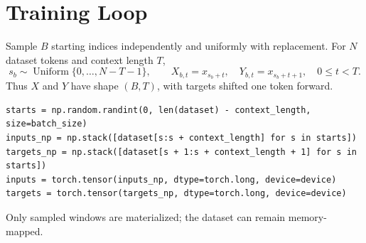 

\section{Training Loop}



Sample $B$ starting indices independently
and uniformly with replacement. For $N$ dataset tokens and context length $T$,
\[
s_b\sim\operatorname{Uniform}\{0,\ldots,N-T-1\},\qquad
X_{b,t}=x_{s_b+t},\quad Y_{b,t}=x_{s_b+t+1},\quad 0\leq t<T.
\]
Thus $X$ and $Y$ have shape $(B,T)$, with targets shifted one token forward.
\par\noindent
\begin{minipage}{\linewidth}
\begin{lstlisting}[caption={Sampling input and target windows}]
starts = np.random.randint(0, len(dataset) - context_length, size=batch_size)
inputs_np = np.stack([dataset[s:s + context_length] for s in starts])
targets_np = np.stack([dataset[s + 1:s + context_length + 1] for s in starts])
inputs = torch.tensor(inputs_np, dtype=torch.long, device=device)
targets = torch.tensor(targets_np, dtype=torch.long, device=device)
\end{lstlisting}
\end{minipage}\par
Only sampled windows are materialized; the dataset can remain memory-mapped.




